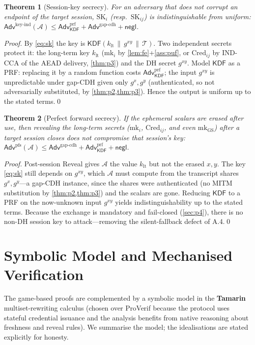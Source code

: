 \documentclass[11pt]{article}
\theoremstyle{plain}
\newtheorem{theorem}{Theorem}
\theoremstyle{definition}
\newcommand{\GS}{\mathrm{GS}}
\newcommand{\Cred}{\mathrm{Cred}}
\newcommand{\mk}{\mathrm{mk}}
\newcommand{\SK}{\mathrm{SK}}
\newcommand{\KDF}{\mathsf{KDF}}
\newcommand{\adv}{\mathcal{A}}
\newcommand{\negl}{\mathsf{negl}}
\newcommand{\Adv}{\mathsf{Adv}}
\newcommand{\catt}{\,\|\,}          %
\newcommand{\transcript}{\mathcal{T}}
\begin{document}
\begin{theorem}[Session-key secrecy]\label{thm:secrecy}
For an adversary that does not corrupt an endpoint of the target session,
$\SK_i$ (resp.\ $\SK_{ij}$) is indistinguishable from uniform:
$\Adv^{\mathrm{key\text{-}ind}}(\adv)\le \Adv^{\mathrm{prf}}_{\KDF}+
\Adv^{\mathrm{gap\text{-}cdh}}+\negl$.
\end{theorem}
\begin{proof}
By \cref{eq:sk} the key is $\KDF(k_{\text{lt}}\catt g^{xy}\catt\transcript)$.
Two independent secrets protect it: the long-term key $k_{\text{lt}}$
($\mk_i$ by \cref{lem:fe}+\cref{ass:puf}, or $\Cred_{ij}$ by IND-CCA of the
AEAD delivery, \cref{thm:p3}) and the DH secret $g^{xy}$. Model $\KDF$ as a
PRF: replacing it by a random function costs $\Adv^{\mathrm{prf}}_{\KDF}$; the
input $g^{xy}$ is unpredictable under gap-CDH given only $g^{x},g^{y}$
(authenticated, so not adversarially substituted, by
\cref{thm:p2,thm:p3}). Hence the output is uniform up to the stated terms.\qed
\end{proof}

\begin{theorem}[Perfect forward secrecy]\label{thm:pfs}
If the ephemeral scalars are erased after use, then revealing the long-term
secrets ($\mk_i$, $\Cred_{ij}$, and even $\mk_{\GS}$) \emph{after} a target
session closes does not compromise that session's key:
$\Adv^{\mathrm{pfs}}(\adv)\le \Adv^{\mathrm{gap\text{-}cdh}}+
\Adv^{\mathrm{prf}}_{\KDF}+\negl$.
\end{theorem}
\begin{proof}
Post-session \textsf{Reveal} gives $\adv$ the value $k_{\text{lt}}$ but not
the erased $x,y$. The key \cref{eq:sk} still depends on $g^{xy}$, which
$\adv$ must compute from the transcript shares $g^{x},g^{y}$---a gap-CDH
instance, since the shares were authenticated (no MITM substitution by
\cref{thm:p2,thm:p3}) and the scalars are gone. Reducing $\KDF$ to a PRF on
the now-unknown input $g^{xy}$ yields indistinguishability up to the stated
terms. Because the exchange is mandatory and fail-closed (\cref{sec:p4}),
there is no non-DH session key to attack---removing the silent-fallback
defect of A.4.\qed
\end{proof}

\section{Symbolic Model and Mechanised Verification}
\label{sec:symbolic}
The game-based proofs are complemented by a symbolic model in the
\textbf{Tamarin} multiset-rewriting calculus (chosen over ProVerif because
the protocol uses stateful credential issuance and the analysis benefits
from native reasoning about freshness and reveal rules). We summarise the
model; the idealisations are stated explicitly for honesty.
\end{document}
